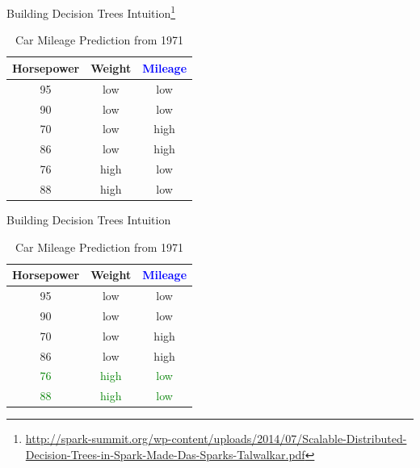 \documentclass{beamer}
\newcommand{\furl}[1]{{\footnote{\url{#1}}}}
\begin{document}
\begin{frame}{Building Decision Trees Intuition\furl{http://spark-summit.org/wp-content/uploads/2014/07/Scalable-Distributed-Decision-Trees-in-Spark-Made-Das-Sparks-Talwalkar.pdf}}
\begin{center}
    \begin{table}
        \begin{tabular}{| c | c | c |}
            \hline
            {\bf Horsepower} & {\bf Weight} & \textcolor{blue}{{\bf Mileage}} \\ \hline
                95 & low & low \\ \hline
                90 & low & low \\ \hline
                70 & low & high \\ \hline
                86 & low & high \\ \hline
                76 & high & low \\ \hline
                88 & high & low \\ \hline
        \end{tabular}
        \caption{Car Mileage Prediction from 1971}
    \end{table}
\end{center}
\end{frame}
\begin{frame}{Building Decision Trees Intuition}
\begin{center}
    \begin{table}
        \begin{tabular}{| c | c | c |}
            \hline
            {\bf Horsepower} & {\bf Weight} & \textcolor{blue}{{\bf Mileage}} \\ \hline
                95 & low & low \\ \hline
                90 & low & low \\ \hline
                70 & low & high \\ \hline
                86 & low & high \\ \hline
                \textcolor{green}{76} & \textcolor{green}{high} & \textcolor{green}{low} \\ \hline
                \textcolor{green}{88} & \textcolor{green}{high} & \textcolor{green}{low} \\ \hline
        \end{tabular}
        \caption{Car Mileage Prediction from 1971}
    \end{table}
\end{center}
\end{frame}
\end{document}
